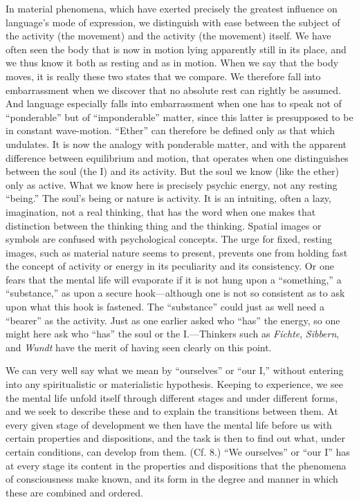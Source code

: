 \documentclass[12pt,a4paper]{book}
\newcommand{\opage}[1]{\marginnote{\footnotesize\textit{[#1]}}}
\begin{document}
In material phenomena, which have exerted precisely the greatest
influence on language's mode of expression, we distinguish with ease
between the subject of the activity (the movement) and the activity (the
movement) itself. We have often seen the body that is now in motion
lying apparently still in its place, and we thus know it both as resting
and as in motion. When we say that the body moves, it is really these
two states that we compare. We therefore fall into embarrassment when we
discover that no absolute rest can rightly be assumed. And language
especially falls into embarrassment when one has to speak not of
``ponderable'' but of ``imponderable'' matter, since this latter is
presupposed to be in constant wave-motion. ``Ether'' can therefore be
defined only as that which undulates. It is now the analogy with
ponderable matter, and with the apparent difference between equilibrium
and motion, that operates when one distinguishes between the soul (the
I) and its activity. But the soul we know (like the ether) only as
active. What we know here is precisely psychic energy, not any resting
``being.'' The soul's being or nature is activity. It is an intuiting,
often a lazy, imagination, not a real thinking, that has the word when
one makes that distinction between the thinking thing and the thinking.
Spatial images or symbols are confused with psychological concepts. The
urge for fixed, resting images, such as material nature seems to present,
prevents one from holding fast the concept of activity or energy in its
peculiarity and its consistency. Or one fears that the mental life will
evaporate if it is not hung upon a ``something,'' a ``substance,'' as
upon a secure hook---although one is not so consistent as to ask upon
what this hook is fastened. The ``substance'' could just as well need a
``bearer'' as the activity. Just as one \opage{36}earlier asked who ``has'' the
energy, so one might here ask who ``has'' the soul or the I.---Thinkers
such as \emph{Fichte}, \emph{Sibbern}, and \emph{Wundt} have the merit
of having seen clearly on this point.

We can very well say what we mean by ``ourselves'' or ``our I,'' without
entering into any spiritualistic or materialistic hypothesis. Keeping to
experience, we see the mental life unfold itself through different stages
and under different forms, and we seek to describe these and to explain
the transitions between them. At every given stage of development we then
have the mental life before us with certain properties and dispositions,
and the task is then to find out what, under certain conditions, can
develop from them. (Cf. 8.) ``We ourselves'' or ``our I'' has at every
stage its content in the properties and dispositions that the phenomena
of consciousness make known, and its form in the degree and manner in
which these are combined and ordered.
\end{document}
